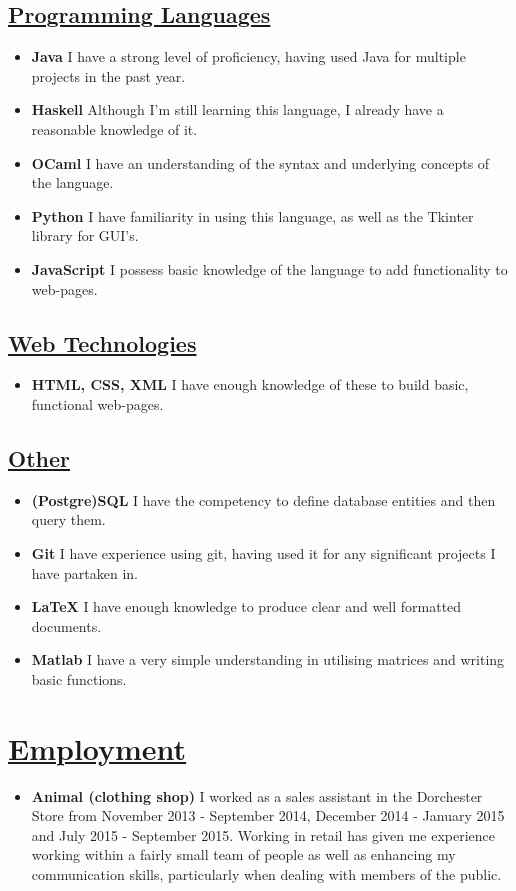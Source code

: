 \documentclass[11pt]{article}
\begin{document}
		\subsection*{\underline{Programming Languages}}
		\begin{itemize}
			\item \textbf{Java} I have a strong level of proficiency, having used Java for multiple projects in the past year.
			\item \textbf{Haskell} Although I'm still learning this language, I already have a reasonable knowledge of it.
			\item \textbf{OCaml} I have an understanding of the syntax and underlying concepts of the language.
			\item \textbf{Python} I have familiarity in using this language, as well as the Tkinter library for GUI's. 
			\item \textbf{JavaScript} I possess basic knowledge of the language to add functionality to web-pages.
		\end{itemize} 
		\subsection*{\underline{Web Technologies}}
		\begin{itemize}
			\item \textbf{HTML, CSS, XML} I have enough knowledge of these to build basic, functional web-pages.
		\end{itemize}
		\subsection*{\underline{Other}}
		\begin{itemize}
			\item \textbf{(Postgre)SQL} I have the competency to define database entities and then query them.
			\item \textbf{Git} I have experience using git, having used it for any significant projects I have partaken in.
			\item \textbf{LaTeX} I have enough knowledge to produce clear and well formatted documents.
			\item \textbf{Matlab} I have a very simple understanding in utilising matrices and writing basic functions.
		\end{itemize}

	\vspace{-20pt}
	\hspace{-100pt}\section*{\underline{Employment}}
			\begin{itemize}
				\item \textbf{Animal (clothing shop) }I worked as a sales assistant in the Dorchester Store from November 2013 - September 2014, December 2014 - January 2015 and July 2015 - September 2015. Working in retail has given me experience working within a fairly small team of people as well as enhancing my communication skills, particularly when dealing with members of the public. 
			\end{itemize}
\end{document}

